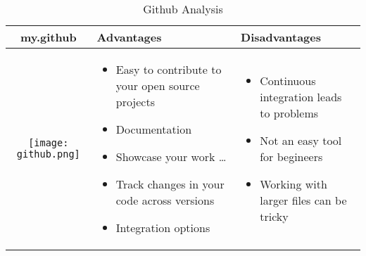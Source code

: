 \documentclass{article}
\begin{document}
	
	\begin{table}[h!]
		\centering
		\begin{tabular}{ | c | m{5cm} | m{5cm} | }
			\hline
			my.github & Advantages & Disadvantages \\ \hline
			\begin{minipage}{.4\textwidth}
			\texttt{[image: github.png]}	
		\end{minipage}
		    &
		\begin{itemize}
			\item Easy to contribute to your open source projects
			\item Documentation
			\item Showcase your work \ldots
			\item Track changes in your code across versions
			\item Integration options
		\end{itemize}
	  &
	    \begin{itemize}
	    	\item Continuous integration leads to problems
	    	\item Not an easy tool for begineers
	    	\item Working with larger files can be tricky
	    \end{itemize}
     \\ \hline
    \end{tabular}
\caption{Github Analysis}\label{tbl:mygitHub}
		\end{table}
	
\end{document}
